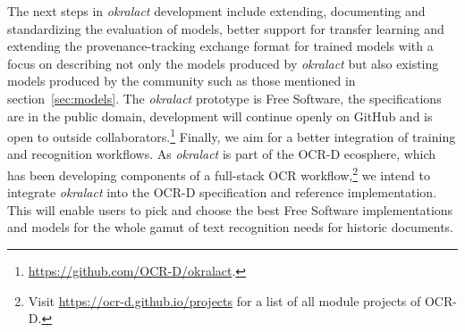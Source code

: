 \documentclass[sigconf]{acmart}
\begin{document}
The next steps in \textit{okralact} development include extending, documenting and standardizing
the evaluation of models, better support for transfer learning \cite{027.7169} and extending the provenance-tracking exchange format for trained models with a focus on describing not only the models produced by \textit{okralact} but
also existing models produced by the community such as those mentioned in
section~\ref{sec:models}. The \textit{okralact} prototype is Free Software, the
specifications are in the public domain, development will continue openly on
GitHub and is open to outside collaborators.\footnote{\url{https://github.com/OCR-D/okralact}.}
Finally, we aim for a better integration of training and
recognition workflows. As \textit{okralact} is part of the OCR-D
ecosphere, which has been developing components of a full-stack
OCR workflow,\footnote{Visit \url{https://ocr-d.github.io/projects} for a list of all module projects of OCR-D.} 
we intend to integrate \textit{okralact} into the
OCR-D specification and reference implementation. This will enable
users to pick and choose the best Free Software implementations and models for
the whole gamut of text recognition needs for historic documents.



\end{document}
